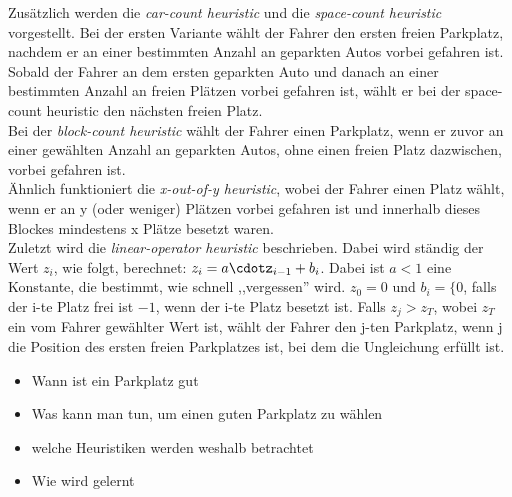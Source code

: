 Zusätzlich werden die \emph{car-count heuristic} und die \emph{space-count heuristic} vorgestellt. Bei der ersten Variante wählt der Fahrer den ersten freien Parkplatz, nachdem er an einer bestimmten Anzahl an geparkten Autos vorbei gefahren ist. Sobald der Fahrer an dem ersten geparkten Auto und danach an einer bestimmten Anzahl an freien Plätzen vorbei gefahren ist, wählt er bei der space-count heuristic den nächsten freien Platz.\\
Bei der \emph{block-count heuristic} wählt der Fahrer einen Parkplatz, wenn er zuvor an einer gewählten Anzahl an geparkten Autos, ohne einen freien Platz dazwischen, vorbei gefahren ist.\\
Ähnlich funktioniert die \emph{x-out-of-y heuristic}, wobei der Fahrer einen Platz wählt, wenn er an y (oder weniger) Plätzen vorbei gefahren ist und innerhalb dieses Blockes mindestens x Plätze besetzt waren. \\
Zuletzt wird die \emph{linear-operator heuristic} beschrieben. Dabei wird ständig der Wert $z_i$, wie folgt, berechnet: $z_i=a\cdotz_{i-1}+b_i$. Dabei ist $a<1$ eine Konstante, die bestimmt, wie schnell ,,vergessen'' wird. $z_0=0$ und $b_i=\lbrace 0$, falls der i-te Platz frei ist $-1$, wenn der i-te Platz besetzt ist. %
Falls $z_j>z_T$, wobei $z_T$ ein vom Fahrer gewählter Wert ist, wählt der Fahrer den j-ten Parkplatz, wenn j die Position des ersten freien Parkplatzes ist, bei dem die Ungleichung erfüllt ist. 

\begin{itemize}
	\item Wann ist ein Parkplatz gut
	\item Was kann man tun, um einen guten Parkplatz zu wählen
	\item welche Heuristiken werden weshalb betrachtet
	\item Wie wird gelernt
\end{itemize}